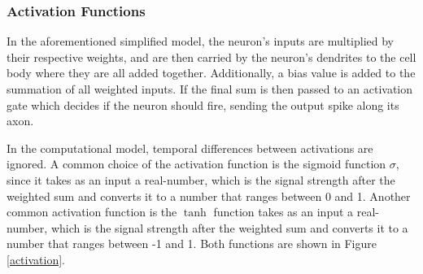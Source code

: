 \subsubsection{Activation Functions}
In the aforementioned simplified model, the neuron's inputs are multiplied by their respective weights, and are then carried by the neuron's dendrites to the cell body where they are all added together. Additionally, a bias value is added to the summation of all weighted inputs. If the final sum is then passed to an activation gate which decides if the neuron should fire, sending the output spike along its axon. 

In the computational model, temporal differences between activations are ignored. A common choice of the activation function is the sigmoid function \(\sigma\), since it takes as an input a real-number, which is the signal strength after the weighted sum and converts it to a number that ranges between 0 and 1. Another common activation function is the \(\tanh\) function takes as an input a real-number, which is the signal strength after the weighted sum and converts it to a number that ranges between -1 and 1. Both functions are shown in Figure \ref{activation}.

